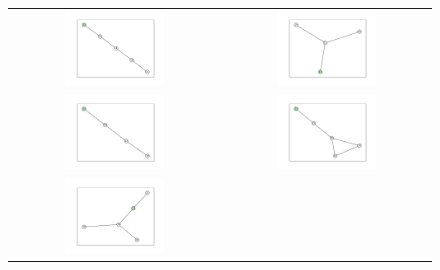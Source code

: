 \documentclass[12pt, a4paper]{extarticle}
\begin{document}
\begin{figure}\centering\begin{tabularx}{\textwidth}{cc}
\includegraphics[width=0.5\textwidth]{task11-graphlets/5_10-11-14-21-23.pdf} &
\includegraphics[width=0.5\textwidth]{task11-graphlets/4_14-21-22-23.pdf} \\
\includegraphics[width=0.5\textwidth]{task11-graphlets/4_19-22-23-24.pdf} &
\includegraphics[width=0.5\textwidth]{task11-graphlets/5_10-14-16-25-23.pdf} \\
\includegraphics[width=0.5\textwidth]{task11-graphlets/5_16-21-18-19-23.pdf} &

\end{tabularx}
\end{figure}
\end{document}

